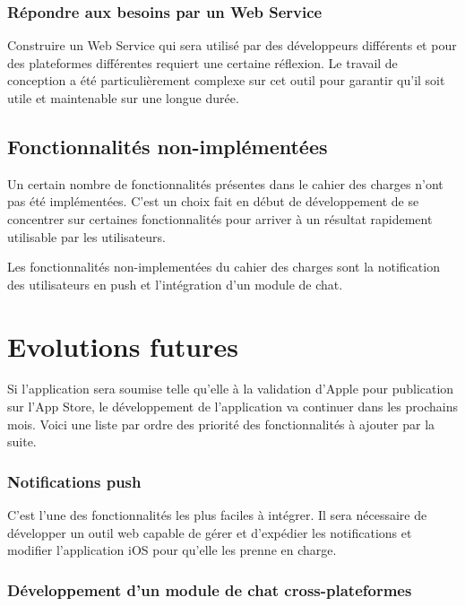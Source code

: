 \documentclass[11pt, french]{report}
\begin{document}
\subsubsection{Répondre aux besoins par un Web Service}

Construire un Web Service qui sera utilisé par des développeurs différents et pour des plateformes différentes requiert une certaine réflexion. Le travail de conception a été particulièrement complexe sur cet outil pour garantir qu'il soit utile et maintenable sur une longue durée.

\subsection{Fonctionnalités non-implémentées}

Un certain nombre de fonctionnalités présentes dans le cahier des charges n'ont pas été implémentées. C'est un choix fait en début de développement de se concentrer sur certaines fonctionnalités pour arriver à un résultat rapidement utilisable par les utilisateurs.

Les fonctionnalités non-implementées du cahier des charges sont la notification des utilisateurs en push et l'intégration d'un module de chat.

\section{Evolutions futures}

Si l'application sera soumise telle qu'elle à la validation d'Apple pour publication sur l'App Store, le développement de l'application va continuer dans les prochains mois. Voici une liste par ordre des priorité des fonctionnalités à ajouter par la suite.

\subsubsection{Notifications push}

C'est l'une des fonctionnalités les plus faciles à intégrer. Il sera nécessaire de développer un outil web capable de gérer et d'expédier les notifications et modifier l'application iOS pour qu'elle les prenne en charge.

\subsubsection{Développement d'un module de chat cross-plateformes}
\end{document}
